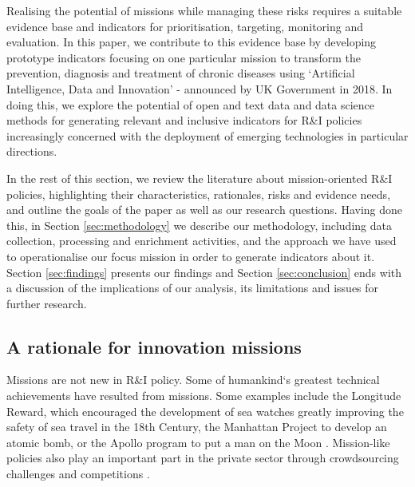 \documentclass[11pt]{article}
\begin{document}
Realising the potential of missions while managing these risks requires a suitable evidence base and indicators for prioritisation, targeting, monitoring and evaluation. In this paper, we contribute to this evidence base by developing prototype indicators focusing on one particular mission \- to transform the prevention, diagnosis and treatment of chronic diseases using `Artificial Intelligence, Data and Innovation' - announced by UK Government in 2018. In doing this, we explore the potential of open and text data and data science methods for generating relevant and inclusive indicators for R\&I policies increasingly concerned with the deployment of emerging technologies in particular directions. 

In the rest of this section, we review the literature about mission-oriented R\&I policies, highlighting their characteristics, rationales, risks and evidence needs, and outline the goals of the paper as well as our research questions. Having done this, in Section \ref{sec:methodology} we describe our methodology, including data collection, processing and enrichment activities, and the approach we have used to operationalise our focus mission in order to generate indicators about it. Section \ref{sec:findings} presents our findings and Section \ref{sec:conclusion} ends with a discussion of the implications of our analysis, its limitations and issues for further research.

\subsection{A rationale for innovation missions}
\label{subsec: history}

Missions are not new in R\&I policy. Some of humankind`s greatest technical achievements have resulted from missions. Some examples include the Longitude Reward, which encouraged the development of sea watches greatly improving the safety of sea travel in the 18th Century, the Manhattan Project to develop an atomic bomb, or the Apollo program to put a man on the Moon \citep{nelson_moon_1977}. Mission-like policies also play an important part in the private sector through crowdsourcing challenges and competitions \citep{lakhani_attributes_2012}. 
\end{document}
